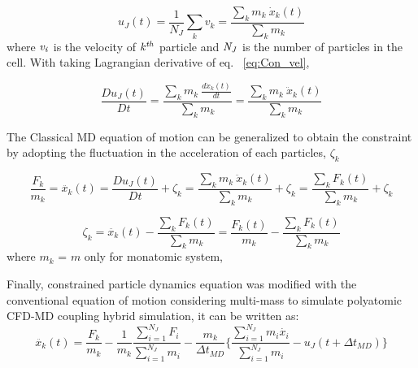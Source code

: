 \documentclass[]{aiaa-tc}%
\begin{document}
\begin{equation}
 u_{J}(t) = \frac{1}{N_{J}} \displaystyle\sum_{k} v_{k} =  {  \frac{\displaystyle\sum_{k}m_{k}\  {\dot x_k(t)}} {\displaystyle\sum_{k}m_{k}}}
 \label{eq:Con_vel}
\end{equation}
\normalsize
where $\it v_{i}$ is the velocity of $\it k^{th}$ particle and $\it N_{J}$ is the number of particles in the cell.  With taking Lagrangian derivative of eq. ~\ref{eq:Con_vel},

\vspace{-.2em}
\begin{equation}
 \frac{Du_{J}(t)}{Dt} = {  \frac{\displaystyle\sum_{k}m_{k}\  \frac{d\dot x_k(t)}{dt} } {\displaystyle\sum_{k}m_{k}}} = {  \frac{\displaystyle\sum_{k}m_{k}\  {\ddot x_k(t)}} {\displaystyle\sum_{k}m_{k}}}
 \label{eq:gov1}
\end{equation}
\normalsize

The Classical MD equation of motion can be generalized to obtain the constraint by adopting the fluctuation in the acceleration of each particles, $\zeta_{k}$

\vspace{-.2em}
\begin{equation}
\frac{F_{k}}{m_{k}}  =  \ddot{x_{k}}(t) =  \frac{Du_{J}(t)}{Dt} + \zeta_{k} = {  \frac{\displaystyle\sum_{k}m_{k}\  {\ddot x_k(t)}} {\displaystyle\sum_{k}m_{k}}}+ \zeta_{k} =  {  \frac{\displaystyle\sum_{k}F_{k}(t)} {\displaystyle\sum_{k}m_{k}}}+ \zeta_{k}
 \label{eq:zeta1}
\end{equation}

\begin{equation}
\zeta_{k} = \ddot{x_{k}}(t) - {  \frac{\displaystyle\sum_{k}F_{k}(t)} {\displaystyle\sum_{k}m_{k}}}= \frac{F_{k}(t)}{m_{k}} - {  \frac{\displaystyle\sum_{k}F_{k}(t)} {\displaystyle\sum_{k}m_{k}}} 
 \label{eq:zeta2}
\end{equation}
\normalsize
where $m_k$  = $m$ only for monatomic system, 

Finally, constrained particle dynamics equation was modified with the conventional equation of motion considering multi-mass to simulate polyatomic CFD-MD coupling hybrid simulation, it can be written as:
\vspace{-.2em}
\begin{equation}
 \ddot{x_{k}}(t) = \frac{F_{k}}{m_{k}} -  \frac{1}{m_k} \frac{\displaystyle\sum_{i=1}^{N_J}F_{i}} {\displaystyle\sum_{i=1}^{N_J}m_{i}} - \frac{m_k}{\Delta t_{MD}} \{  \frac{\displaystyle\sum_{i=1}^{N_J}m_{i}\dot{x_{i}}} {\displaystyle\sum_{i=1}^{N_J}m_{i}} - u_{J}(t + \Delta t_{MD})\}
 \label{eq:EOM}
\end{equation}
\normalsize
\end{document}
